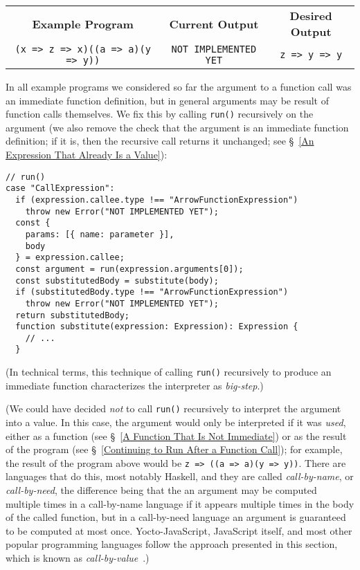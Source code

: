 \documentclass[12pt, oneside]{book}
\begin{document}
\begin{center}
\begin{tabular}{c|c|c}
\textbf{Example Program} & \textbf{Current Output} & \textbf{Desired Output} \\
\texttt{(x => z => x)((a => a)(y => y))} & \texttt{NOT IMPLEMENTED YET} & \texttt{z => y => y} \\
\end{tabular}
\end{center}

\noindent In all example programs we considered so far the argument to a function call was an immediate function definition, but in general arguments may be result of function calls themselves. We fix this by calling \texttt{run()} recursively on the argument (we also remove the check that the argument is an immediate function definition; if it is, then the recursive call returns it unchanged; see §~\ref{An Expression That Already Is a Value}):

\begin{verbatim}
// run()
case "CallExpression":
  if (expression.callee.type !== "ArrowFunctionExpression")
    throw new Error("NOT IMPLEMENTED YET");
  const {
    params: [{ name: parameter }],
    body
  } = expression.callee;
  const argument = run(expression.arguments[0]);
  const substitutedBody = substitute(body);
  if (substitutedBody.type !== "ArrowFunctionExpression")
    throw new Error("NOT IMPLEMENTED YET");
  return substitutedBody;
  function substitute(expression: Expression): Expression {
    // ...
  }
\end{verbatim}

(In technical terms, this technique of calling \texttt{run()} recursively to produce an immediate function characterizes the interpreter as \emph{big-step}.)

(We could have decided \emph{not} to call \texttt{run()} recursively to interpret the argument into a value. In this case, the argument would only be interpreted if it was \emph{used}, either as a function (see §~\ref{A Function That Is Not Immediate}) or as the result of the program (see §~\ref{Continuing to Run After a Function Call}); for example, the result of the program above would be \texttt{z => ((a => a)(y => y))}. There are languages that do this, most notably Haskell, and they are called \emph{call-by-name}, or \emph{call-by-need}, the difference being that the an argument may be computed multiple times in a call-by-name language if it appears multiple times in the body of the called function, but in a call-by-need language an argument is guaranteed to be computed at most once. Yocto-JavaScript, JavaScript itself, and most other popular programming languages follow the approach presented in this section, which is known as \emph{call-by-value}~\cite{call-by-name-call-by-value-and-the-lambda-calculus}.)
\end{document}
